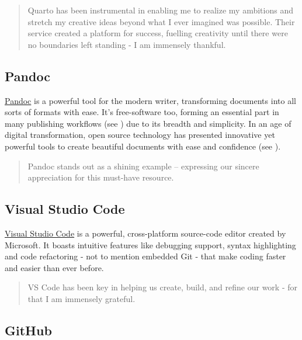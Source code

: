 \documentclass[
  twoside,
  12pt,
  letterpaper,
  fleqn]{article}
\begin{document}
\begin{quote}
Quarto has been instrumental in enabling me to realize my ambitions and
stretch my creative ideas beyond what I ever imagined was possible.
Their service created a platform for success, fuelling creativity until
there were no boundaries left standing - I am immensely thankful.
\end{quote}

\hypertarget{pandoc}{%
\subsection{Pandoc}\label{pandoc}}

\href{https://pandoc.org}{Pandoc} is a powerful tool for the modern
writer, transforming documents into all sorts of formats with ease. It's
free-software too, forming an essential part in many publishing
workflows (see \textcite{krewinkel2017formatting}) due to its breadth
and simplicity. In an age of digital transformation, open source
technology has presented innovative yet powerful tools to create
beautiful documents with ease and confidence (see
\textcite{mailund2019introducing}).

\begin{quote}
Pandoc stands out as a shining example -- expressing our sincere
appreciation for this must-have resource.
\end{quote}

\hypertarget{visual-studio-code}{%
\subsection{Visual Studio Code}\label{visual-studio-code}}

\href{https://code.visualstudio.com}{Visual Studio Code} is a powerful,
cross-platform source-code editor created by Microsoft. It boasts
intuitive features like debugging support, syntax highlighting and code
refactoring - not to mention embedded Git - that make coding faster and
easier than ever before.

\begin{quote}
VS Code has been key in helping us create, build, and refine our work -
for that I am immensely grateful.
\end{quote}

\hypertarget{github}{%
\subsection{GitHub}\label{github}}
\end{document}
